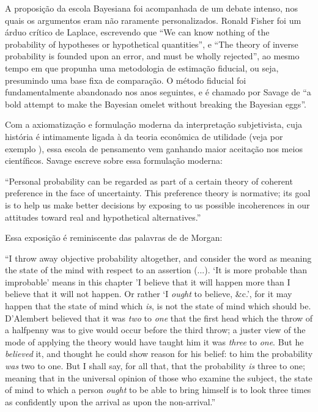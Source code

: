 A proposição da escola Bayesiana foi acompanhada de um debate intenso, nos quais os argumentos eram não raramente personalizados.
Ronald Fisher foi um árduo crítico
de Laplace, escrevendo que ``We can know nothing of the probability of hypotheses or hypothetical quantities''\cite{Fisher1921},
e ``The theory of inverse probability is founded upon an error, and must be wholly rejected''\cite{Fisher1925}, ao mesmo tempo
em que propunha uma metodologia de estimação fiducial, ou seja, presumindo uma base fixa de comparação. O método fiducial foi
fundamentalmente abandonado nos anos seguintes, e é chamado por Savage de ``a bold attempt to make the Bayesian omelet without
breaking the Bayesian eggs''\cite{Savage60}. 

Com a axiomatização e formulação moderna da interpretação subjetivista, cuja história é intimamente ligada à da teoria
econômica de utilidade (veja por exemplo \cite{Friedman48}),
essa escola de pensamento vem ganhando maior aceitação nos meios científicos. Savage escreve sobre essa formulação moderna:

``Personal probability can be regarded as part of a certain theory of coherent preference in the face of uncertainty. This
preference theory is normative; its goal is to help us make better decisions by exposing to us possible incoherences in our
attitudes toward real and hypothetical alternatives.''\cite{Savage67}

Essa exposição é reminiscente das palavras de de Morgan:

``I throw away objective probability altogether, and consider the word as meaning the state of the mind with respect to an 
assertion (...). `It is more probable than improbable' means in this chapter 'I believe that it will happen more than I 
believe that it will not happen. Or rather `I {\em ought} to believe, \&c.', for it may happen that the state of mind which {\em
is}, is not the state of mind which should be. 
D'Alembert believed that it was {\em two} to {\em one} that the first head which the throw of a halfpenny was to give would occur
before the third throw; a juster view of the mode of applying the theory would have taught him it was {\em three} to {\em one}.
But he {\em believed} it, and thought he could show reason for his belief: to him the probability {\em was} two to one. But 
I shall say, for all that, that the probability {\em is} three to one; meaning that in the universal opinion of those who
examine the subject, the state of mind to which a person {\em ought} to be able to bring himself is to look three times
as confidently upon the arrival as upon the non-arrival.''\cite{deMorgan1847}

